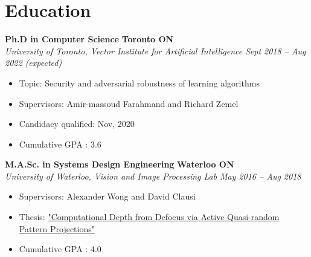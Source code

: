 \section*{Education}
\vspace{\postsubhead}
    \textbf{Ph.D in Computer Science}
    \hfill
    \textbf{Toronto ON}\\
    \textit{University of Toronto, Vector Institute for Artificial Intelligence}
    \hfill
    \textit{Sept 2018 -- Aug 2022 (expected)}
    \begin{itemize}
        \item Topic: Security and adversarial robustness of learning algorithms
        \item Supervisors: Amir-massoud Farahmand and Richard Zemel
        \item Candidacy qualified: Nov, 2020
        \item Cumulative GPA : 3.6
    \end{itemize}
    \vspace{\interlist}
    
    \textbf{M.A.Sc. in Systems Design Engineering}
    \hfill
    \textbf{Waterloo ON}\\
    \textit{University of Waterloo, Vision and Image Processing Lab}
    \hfill
    \textit{May 2016 -- Aug 2018}
    \begin{itemize}
        \item Supervisors: Alexander Wong and David Clausi
        \item Thesis: \href{https://uwspace.uwaterloo.ca/handle/10012/13645}{"Computational Depth from Defocus via Active Quasi-random Pattern Projections"}
        \item Cumulative GPA : 4.0
    \end{itemize}
    \vspace{\interlist}

